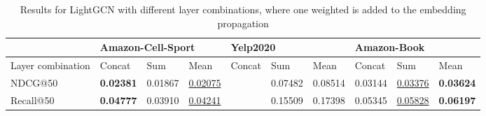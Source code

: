 \begin{table*}[]
    \begin{tabular}{|l|l|l|l|l|l|l|l|l|l|}
        \hline
                          & \multicolumn{3}{l|}{Amazon-Cell-Sport} & \multicolumn{3}{l|}{Yelp2020} & \multicolumn{3}{l|}{Amazon-Book}                                                                                 \\ \hline
        Layer combination & Concat                                 & Sum                           & Mean                             & Concat & Sum     & Mean    & Concat  & Sum                 & Mean             \\ \hline
        NDCG@50           & \textbf{0.02381}                       & 0.01867                       & \underline{0.02075}              &        & 0.07482 & 0.08514 & 0.03144 & \underline{0.03376} & \textbf{0.03624} \\ \hline
        Recall@50         & \textbf{0.04777}                       & 0.03910                       & \underline{0.04241}              &        & 0.15509 & 0.17398 & 0.05345 & \underline{0.05828} & \textbf{0.06197} \\ \hline
    \end{tabular}
    \caption{Results for LightGCN with different layer combinations, where one weighted is added to the embedding propagation}
    \label{tab:lightgcn-1-weight}
\end{table*}
